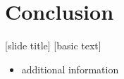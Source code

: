 \documentclass{beamer}
\begin{document}
\section{Conclusion}
\begin{frame}{[slide title]}
  [basic text]
  \begin{itemize}
    \item<1-> additional information
  \end{itemize}
\end{frame}


\end{document}
